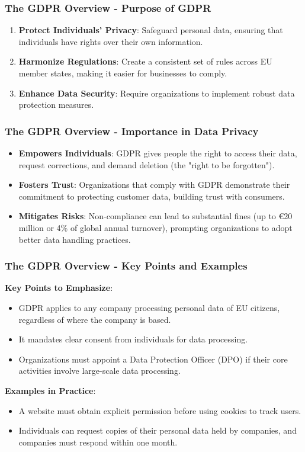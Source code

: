 \documentclass[aspectratio=169]{beamer}
\begin{document}
\begin{frame}[fragile]
    \frametitle{The GDPR Overview - Purpose of GDPR}
    \begin{enumerate}
        \item \textbf{Protect Individuals' Privacy}: Safeguard personal data, ensuring that individuals have rights over their own information.
        \item \textbf{Harmonize Regulations}: Create a consistent set of rules across EU member states, making it easier for businesses to comply.
        \item \textbf{Enhance Data Security}: Require organizations to implement robust data protection measures.
    \end{enumerate}
\end{frame}

\begin{frame}[fragile]
    \frametitle{The GDPR Overview - Importance in Data Privacy}
    \begin{itemize}
        \item \textbf{Empowers Individuals}: GDPR gives people the right to access their data, request corrections, and demand deletion (the "right to be forgotten").
        \item \textbf{Fosters Trust}: Organizations that comply with GDPR demonstrate their commitment to protecting customer data, building trust with consumers.
        \item \textbf{Mitigates Risks}: Non-compliance can lead to substantial fines (up to €20 million or 4\% of global annual turnover), prompting organizations to adopt better data handling practices.
    \end{itemize}
\end{frame}

\begin{frame}[fragile]
    \frametitle{The GDPR Overview - Key Points and Examples}
    
    \textbf{Key Points to Emphasize}:
    \begin{itemize}
        \item GDPR applies to any company processing personal data of EU citizens, regardless of where the company is based.
        \item It mandates clear consent from individuals for data processing.
        \item Organizations must appoint a Data Protection Officer (DPO) if their core activities involve large-scale data processing.
    \end{itemize}
    
    \textbf{Examples in Practice}:
    \begin{itemize}
        \item A website must obtain explicit permission before using cookies to track users.
        \item Individuals can request copies of their personal data held by companies, and companies must respond within one month.
    \end{itemize}
\end{frame}
\end{document}
